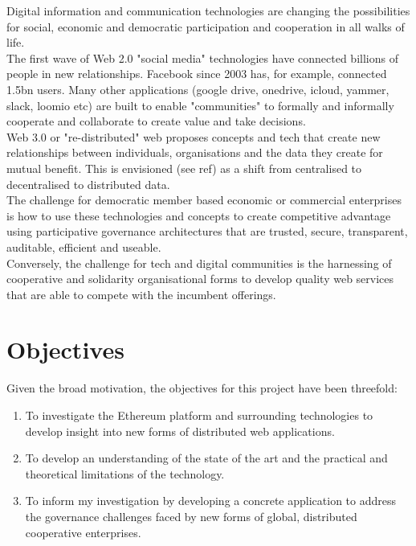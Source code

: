 Digital information and communication technologies are changing the possibilities for social, economic and democratic participation and cooperation in all walks of life.\\

The first wave of Web 2.0 "social media" technologies have connected billions of people in new relationships. Facebook since 2003 has, for example, connected 1.5bn users. Many other applications (google drive, onedrive, icloud, yammer, slack, loomio etc) are built to enable "communities" to formally and informally cooperate and collaborate to create value and take decisions.\\

Web 3.0 or "re-distributed" web proposes concepts and tech that create new relationships between individuals, organisations and the data they create for mutual benefit. This is envisioned (see ref) as a shift from centralised to decentralised to distributed data.\\

The challenge for democratic member based economic or commercial enterprises is how to use these technologies and concepts to create competitive advantage using participative governance architectures that are trusted, secure, transparent, auditable, efficient and useable. \\

Conversely, the challenge for tech and digital communities is the harnessing of cooperative and solidarity organisational forms to develop quality web services that are able to compete with the incumbent offerings. \\

\section{Objectives}
Given the broad motivation, the objectives for this project have been threefold:
\begin{enumerate}
\item To investigate the Ethereum platform and surrounding technologies to develop insight into new forms of distributed web applications.
\item To develop an understanding of the state of the art and the practical and theoretical limitations of the technology.
\item To inform my investigation by developing a concrete application to address the governance challenges faced by new forms of global, distributed cooperative enterprises.
\end{enumerate}

